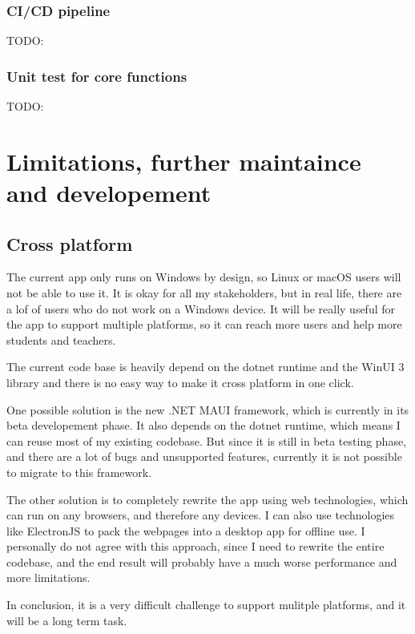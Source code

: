 \documentclass[a4paper]{report}
\begin{document}
\subsubsection{CI/CD pipeline}

TODO:

\subsubsection{Unit test for core functions}

TODO:

\section{Limitations, further maintaince and developement}

\subsection{Cross platform}

The current app only runs on Windows by design, so Linux or macOS users will not be able to use it. It is okay for all my stakeholders, but in real life, there are a lof of users who do not work on a Windows device. It will be really useful for the app to support multiple platforms, so it can reach more users and help more students and teachers.

The current code base is heavily depend on the dotnet runtime and the WinUI 3 library and there is no easy way to make it cross platform in one click.

One possible solution is the new .NET MAUI framework\cite{microsoft:docs:what-is-maui}, which is currently in its beta developement phase. It also depends on the dotnet runtime, which means I can reuse most of my existing codebase. But since it is still in beta testing phase, and there are a lot of bugs and unsupported features, currently it is not possible to migrate to this framework.

The other solution is to completely rewrite the app using web technologies, which can run on any browsers, and therefore any devices. I can also use technologies like ElectronJS\cite{electron} to pack the webpages into a desktop app for offline use. I personally do not agree with this approach, since I need to rewrite the entire codebase, and the end result will probably have a much worse performance and more limitations.

In conclusion, it is a very difficult challenge to support mulitple platforms, and it will be a long term task.
\end{document}
